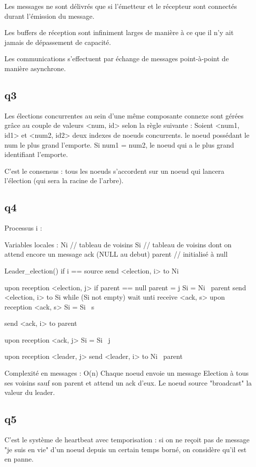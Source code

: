 \documentclass[paper=a4, fontsize=11pt]{report} %
\begin{document}
Les messages ne sont délivrés que si l'émetteur et le récepteur sont connectés durant l'émission du message.

Les buffers de réception sont infiniment larges de manière à ce que il n'y ait jamais de dépassement de capacité.

Les communications s'effectuent par échange de messages point-à-point de manière asynchrone.

\subsection{q3}

Les élections concurrentes au sein d'une même composante connexe sont gérées grâce au couple de valeurs <num, id> selon la règle suivante :
Soient <num1, id1> et <num2, id2> deux indexes de noeuds concurrents. le noeud possédant le num le plus grand l'emporte.
Si num1 = num2, le noeud qui a le plus grand identifiant l'emporte.

C'est le consensus : tous les noeuds s'accordent sur un noeud qui lancera l'élection (qui sera la racine de l'arbre).


\subsection{q4}

Processus i :

Variables locales :
Ni // tableau de voisins
Si  // tableau de voisins dont on attend encore un message ack (NULL au debut)
parent // initialisé à null

Leader\_election() {
	if i == source
		send <election, i> to Ni	
}

upon reception <election, j>
	if parent == null
		parent = j
		Si = Ni \ parent
		send <election, i> to Si
		while (Si not empty)
			wait unti receive <ack, s>
			upon reception <ack, s>
			Si = Si \ s

	send <ack, i> to parent
			

upon reception <ack, j>
	Si = Si \ j

upon reception <leader, j>
	send <leader, i> to Ni \ parent


Complexité en messages : O(n)
Chaque noeud envoie un message Election à tous ses voisins sauf son parent et attend un ack d'eux.
Le noeud source "broadcast" la valeur du leader.

 
\subsection{q5}
C'est le système de heartbeat avec temporisation : si on ne reçoit pas de message "je suis en vie" d'un noeud depuis un certain temps borné, on considère qu'il est en panne. 
\end{document}
